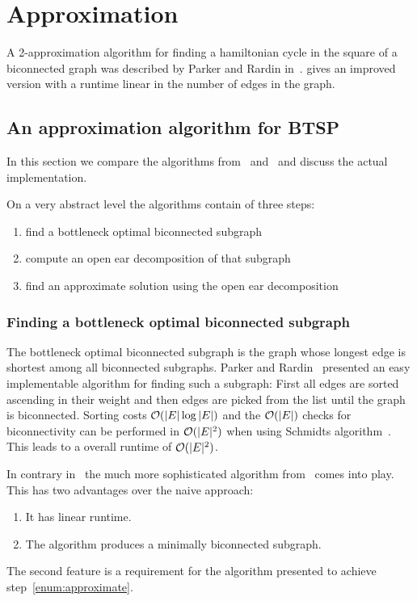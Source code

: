 \chapter{Approximation}

A 2-approximation algorithm for finding a hamiltonian cycle in the square of a biconnected graph was described by Parker and Rardin in~\cite{ParkerRardin1984}. \cite{alstrup2018hamiltonian} gives an improved version with a runtime linear in the number of edges in the graph.

\section{An approximation algorithm for BTSP}
In this section we compare the algorithms from~\cite{ParkerRardin1984} and~\cite{alstrup2018hamiltonian} and discuss the actual implementation.

On a very abstract level the algorithms contain of three steps:
\begin{enumerate}
  \item find a bottleneck optimal biconnected subgraph
  \item compute an open ear decomposition of that subgraph
  \item find an approximate solution using the open ear decomposition\label{enum:approximate}
\end{enumerate}

\subsection{Finding a bottleneck optimal biconnected subgraph}
The bottleneck optimal biconnected subgraph is the graph whose longest edge is shortest among all biconnected subgraphs.
Parker and Rardin~\cite{ParkerRardin1984} presented an easy implementable algorithm for finding such a subgraph: First all edges are sorted ascending in their weight and then edges are picked from the list until the graph is biconnected. Sorting costs \(\mathcal{O}(\vert E \vert \log \vert E \vert)\) and the \(\mathcal{O}(\vert E \vert)\) checks for biconnectivity can be performed in \(\mathcal{O}(\vert E \vert^2)\) when using Schmidts algorithm~\cite{schmidt2013}. This leads to a overall runtime of \(\mathcal{O}(\vert E \vert^2)\).

In contrary in~\cite{alstrup2018hamiltonian} the much more sophisticated algorithm from~\cite{han1995} comes into play. This has two advantages over the naive approach:
\begin{enumerate}
  \item It has linear runtime.
  \item The algorithm produces a minimally biconnected subgraph.
\end{enumerate}
The second feature is a requirement for the algorithm presented to achieve step~\ref{enum:approximate}.

